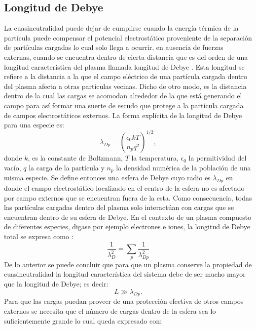 \documentclass[../tesis_main_file.tex]{subfiles}
\begin{document}
\subsection{Longitud de Debye}
La cuasineutralidad puede dejar de cumplirse cuando la energía térmica de la partícula puede compensar el potencial electrostático proveniente de la separación de partículas cargadas lo cual solo llega a ocurrir, en ausencia de fuerzas externas, cuando se encuentra dentro de cierta distancia que es del orden de una longitud característica del plasma llamada longitud de Debye \cite{bittencourt2013fundamentals}.
Esta longitud se refiere a la distancia a la que el campo eléctrico de una partícula cargada dentro del plasma afecta a otras partículas vecinas.
Dicho de otro modo, es la distancia dentro de la cual las cargas se acomodan alrededor de la que está generando el campo para así formar una suerte de escudo que protege a la partícula cargada de campos electrostáticos externos.
La forma explícita de la longitud de Debye para una especie es:
\begin{equation}
\lambda_{Dp} = \left( \frac{\epsilon_0 k T}{n_p q^2} \right)^{1/2},
\end{equation}
donde $k$, es la constante de Boltzmann, $T$ la temperatura, $\epsilon_0$ la permitividad del vacío, $q$ la carga de la partícula y $n_p$ la densidad numérica de la población de una misma especie.
Se define entonces una esfera de Debye cuyo radio es $\lambda_{Dp}$ en donde el campo electrostático localizado en el centro de la esfera no es afectado por campo externos que se encuentran fuera de la esta.
Como consecuencia, todas las partículas cargadas dentro del plasma solo interactúan con cargas que se encuentran dentro de su esfera de Debye.
En el contexto de un plasma compuesto de diferentes especies, digase por ejemplo electrones e iones, la longitud de Debye total se expresa como \cite{nicholson1983introduction}:
\begin{equation}
    \frac{1}{\lambda_D^2}=\sum_p \frac{1}{\lambda_{Dp}^2}
\end{equation}
De lo anterior se puede concluir que para que un plasma conserve la propiedad de cuasineutralidad la longitud característica del sistema debe de ser mucho mayor que la longitud de Debye; es decir:
\begin{equation}
L \gg \lambda_{Dp}.
\end{equation}
Para que las cargas puedan proveer de una protección efectiva de otros campos externos se necesita que el número de cargas dentro de la esfera sea lo suficientemente grande lo cual queda expresado con:
\end{document}
